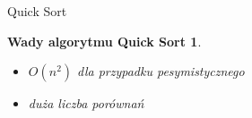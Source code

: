 \begin{frame}[squeeze]{Quick Sort}
	
	\newtheorem*{quicksort*}{Wady algorytmu Quick Sort}
	\begin{quicksort*}
		\begin{itemize}
			\item $O(n^2)$ dla przypadku pesymistycznego
			\item duża liczba porównań
		\end{itemize}
	\end{quicksort*}
	
\end{frame}